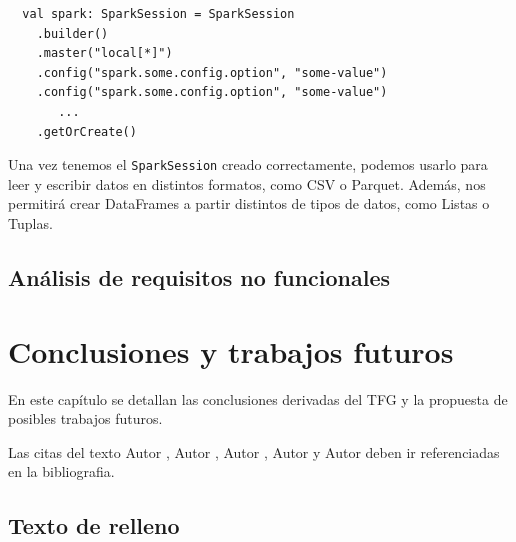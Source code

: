 \documentclass[12pt,twoside,titlepage]{report}
\newcommand\blankpage{%
    \newpage
    \null
    \thispagestyle{empty}%
    \newpage}
\begin{document}
\begin{lstlisting}
  val spark: SparkSession = SparkSession
    .builder()
    .master("local[*]")
    .config("spark.some.config.option", "some-value")
    .config("spark.some.config.option", "some-value")
       ...
    .getOrCreate()
\end{lstlisting}

Una vez tenemos el \texttt{SparkSession} creado correctamente, podemos usarlo para leer y escribir datos en distintos formatos, como CSV o Parquet. Además, nos permitirá crear DataFrames a partir distintos de tipos de datos, como Listas o Tuplas.



\section{Análisis de requisitos no funcionales}







\chapter{Conclusiones y trabajos futuros}
\newpage

En este capítulo se detallan las conclusiones derivadas del TFG y la propuesta de posibles trabajos futuros.

Las citas del texto Autor \cite{giaquinta}, Autor \cite{fortune}, Autor \cite{fortuneB}, Autor \cite{mitchell} y Autor \cite{morrey} deben ir referenciadas en la bibliografia.


\section{Texto de relleno}

\blankpage










{}

\footnotesize{
%


}



\raggedbottom
\afterpage{\blankpage}
\end{document}
